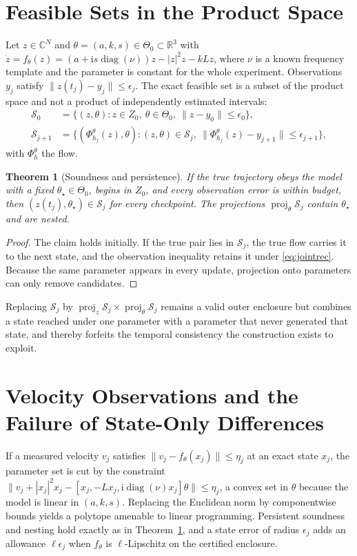 \documentclass[11pt,notitlepage]{report}
\newtheorem{theorem}{Theorem}[chapter]
\theoremstyle{definition}
\theoremstyle{remark}
\newcommand{\R}{\mathbb R}
\newcommand{\C}{\mathbb C}
\newcommand{\ii}{\mathrm i}
\begin{document}
\section{Feasible Sets in the Product Space}
Let $z\in\C^N$ and $\theta=(a,k,s)\in\Theta_0\subset\R^3$ with
$\dot z=f_\theta(z)=(a+\ii s\operatorname{diag}(\nu))z-|z|^2z-kLz$, where $\nu$ is a known frequency template and the parameter is constant for the whole experiment. Observations $y_j$ satisfy $\|z(t_j)-y_j\|\le\epsilon_j$. The exact feasible set is a subset of the product space and not a product of independently estimated intervals:
\begin{align}
\mathcal S_0&=\{(z,\theta):z\in Z_0,\ \theta\in\Theta_0,\ \|z-y_0\|\le\epsilon_0\},\\
\mathcal S_{j+1}&=\{(\Phi^\theta_{h_j}(z),\theta):(z,\theta)\in\mathcal S_j,\ \|\Phi^\theta_{h_j}(z)-y_{j+1}\|\le\epsilon_{j+1}\},\label{eq:jointrec}
\end{align}
with $\Phi^\theta_h$ the flow.
\begin{theorem}[Soundness and persistence]\label{th:jointsound}
If the true trajectory obeys the model with a fixed $\theta_\star\in\Theta_0$, begins in $Z_0$, and every observation error is within budget, then $(z(t_j),\theta_\star)\in\mathcal S_j$ for every checkpoint. The projections $\operatorname{proj}_\theta\mathcal S_j$ contain $\theta_\star$ and are nested.
\end{theorem}
\begin{proof}
The claim holds initially. If the true pair lies in $\mathcal S_j$, the true flow carries it to the next state, and the observation inequality retains it under \eqref{eq:jointrec}. Because the same parameter appears in every update, projection onto parameters can only remove candidates.
\end{proof}
Replacing $\mathcal S_j$ by $\operatorname{proj}_z\mathcal S_j\times\operatorname{proj}_\theta\mathcal S_j$ remains a valid outer enclosure but combines a state reached under one parameter with a parameter that never generated that state, and thereby forfeits the temporal consistency the construction exists to exploit.

\section{Velocity Observations and the Failure of State-Only Differences}
If a measured velocity $v_j$ satisfies $\|v_j-f_\theta(x_j)\|\le\eta_j$ at an exact state $x_j$, the parameter set is cut by the constraint $\|v_j+|x_j|^2x_j-[x_j,-Lx_j,\ii\operatorname{diag}(\nu)x_j]\theta\|\le\eta_j$, a convex set in $\theta$ because the model is linear in $(a,k,s)$. Replacing the Euclidean norm by componentwise bounds yields a polytope amenable to linear programming. Persistent soundness and nesting hold exactly as in Theorem~\ref{th:jointsound}, and a state error of radius $\epsilon_j$ adds an allowance $\ell\epsilon_j$ when $f_\theta$ is $\ell$-Lipschitz on the certified enclosure.
\end{document}

